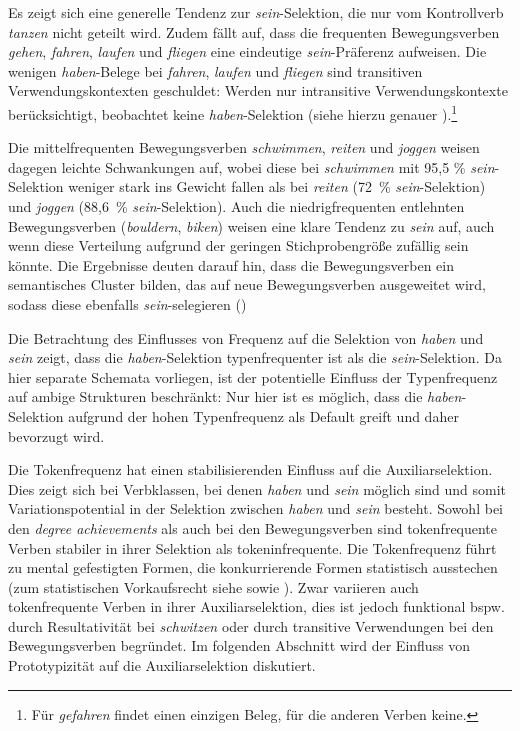 Es zeigt sich eine generelle Tendenz zur \textit{sein}-Selektion, die nur vom Kontrollverb \textit{tanzen} nicht geteilt wird. Zudem fällt auf, dass die frequenten Bewegungsverben \textit{gehen}, \textit{fahren}, \textit{laufen} und \textit{fliegen} eine eindeutige \textit{sein}-Präferenz aufweisen. Die wenigen \textit{haben}-Belege bei \textit{fahren}, \textit{laufen} und \textit{fliegen} sind transitiven Verwendungskontexten geschuldet: Werden nur intransitive Verwendungskontexte berücksichtigt, beobachtet \textcite[268]{Gillmann.2016} keine \textit{haben}-Selektion (siehe hierzu genauer ).\footnote{Für \textit{gefahren} findet \textcite[268]{Gillmann.2016} einen einzigen Beleg, für die anderen Verben keine.} 


Die mittelfrequenten Bewegungsverben \textit{schwimmen}, \textit{reiten} und \textit{joggen} weisen dagegen leichte Schwankungen auf, wobei diese bei \textit{schwimmen} mit 95,5 \% \textit{sein}-Selektion weniger stark ins Gewicht fallen als bei \textit{reiten} (72~\% \textit{sein}-Selektion) und \textit{joggen} (88,6~\% \textit{sein}-Selektion). Auch die niedrigfrequenten entlehnten Bewegungsverben (\textit{bouldern}, \textit{biken}) weisen eine klare Tendenz zu \textit{sein} auf, auch wenn diese Verteilung aufgrund der geringen Stichprobengröße zufällig sein könnte. Die Ergebnisse deuten darauf hin, dass die Bewegungsverben ein semantisches Cluster bilden, das auf neue Bewegungsverben ausgeweitet wird, sodass diese ebenfalls \textit{sein}-selegieren (\cite[250]{Gillmann.2018}) 

Die Betrachtung des Einflusses von Frequenz auf die Selektion von \textit{haben} und \textit{sein} zeigt, dass die \textit{haben}-Selektion typenfrequenter ist als die \textit{sein}-Selektion. Da hier separate Schemata vorliegen, ist der potentielle Einfluss der Typenfrequenz auf ambige Strukturen beschränkt: Nur hier ist es möglich, dass die \textit{haben}-Selektion aufgrund der hohen Typenfrequenz als Default greift und daher bevorzugt wird.

 
Die Tokenfrequenz hat einen stabilisierenden Einfluss auf die Auxiliarselektion. Dies zeigt sich bei Verbklassen, bei denen \textit{haben} und \textit{sein} möglich sind und somit Variationspotential in der Selektion zwischen \textit{haben} und \textit{sein} besteht. Sowohl bei den \textit{degree achievements} als auch bei den Bewegungsverben sind tokenfrequente Verben stabiler in ihrer Selektion als tokeninfrequente. Die Tokenfrequenz führt zu mental gefestigten Formen, die konkurrierende Formen statistisch ausstechen (zum statistischen Vorkaufsrecht siehe \cite[74--94]{Goldberg.2019} sowie ). Zwar variieren auch tokenfrequente Verben in ihrer Auxiliarselektion, dies ist jedoch funktional bspw. durch Resultativität bei \textit{schwitzen} oder durch transitive Verwendungen bei den Bewegungsverben begründet. Im folgenden Abschnitt wird der Einfluss von Prototypizität auf die Auxiliarselektion diskutiert.

